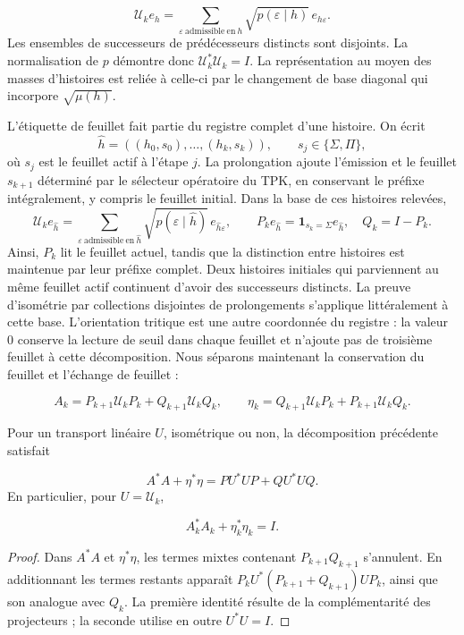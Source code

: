 \[
\mathcal U_ke_h=
\sum_{\varepsilon\ \mathrm{admissible\ en}\ h}
\sqrt{p(\varepsilon\mid h)}\,e_{h\varepsilon}.
\]
Les ensembles de successeurs de prédécesseurs distincts sont disjoints. La normalisation de \(p\) démontre donc \(\mathcal U_k^*\mathcal U_k=I\). La représentation au moyen des masses d’histoires est reliée à celle-ci par le changement de base diagonal qui incorpore \(\sqrt{\mu(h)}\).

L'étiquette de feuillet fait partie du registre complet d'une histoire. On écrit
\[
\widehat h=((h_0,s_0),\ldots,(h_k,s_k)),\qquad
s_j\in\{\Sigma,\Pi\},
\]
où \(s_j\) est le feuillet actif à l'étape \(j\). La prolongation ajoute l'émission et le feuillet \(s_{k+1}\) déterminé par le sélecteur opératoire du TPK, en conservant le préfixe intégralement, y compris le feuillet initial. Dans la base de ces histoires relevées,
\[
\mathcal U_ke_{\widehat h}
=\sum_{\varepsilon\ \mathrm{admissible\ en}\ \widehat h}
\sqrt{p(\varepsilon\mid\widehat h)}\,e_{\widehat h\varepsilon},
\qquad
P_ke_{\widehat h}=\mathbf1_{s_k=\Sigma}e_{\widehat h},\quad
Q_k=I-P_k.
\]
Ainsi, \(P_k\) lit le feuillet actuel, tandis que la distinction entre histoires est maintenue par leur préfixe complet. Deux histoires initiales qui parviennent au même feuillet actif continuent d’avoir des successeurs distincts. La preuve d’isométrie par collections disjointes de prolongements s’applique littéralement à cette base.
L’orientation tritique est une autre coordonnée du registre : la valeur \(0\) conserve la lecture de seuil dans chaque feuillet et n’ajoute pas de troisième feuillet à cette décomposition. Nous séparons maintenant la conservation du feuillet et l’échange de feuillet :

\[
A_k=P_{k+1}\mathcal U_kP_k+Q_{k+1}\mathcal U_kQ_k,
\qquad
\eta_k=Q_{k+1}\mathcal U_kP_k+P_{k+1}\mathcal U_kQ_k.
\]
\begin{proposition}
\label{iv:cont:gram}
Pour un transport linéaire \(U\), isométrique ou non, la décomposition précédente satisfait

\[
A^*A+\eta^*\eta=PU^*UP+QU^*UQ.
\]
En particulier, pour \(U=\mathcal U_k\),

\[
A_k^*A_k+\eta_k^*\eta_k=I.
\]
\end{proposition}
\begin{proof}
Dans \(A^*A\) et \(\eta^*\eta\), les termes mixtes contenant \(P_{k+1}Q_{k+1}\) s'annulent. En additionnant les termes restants apparaît \(P_kU^*(P_{k+1}+Q_{k+1})UP_k\), ainsi que son analogue avec \(Q_k\). La première identité résulte de la complémentarité des projecteurs ; la seconde utilise en outre \(U^*U=I\).
\end{proof}

